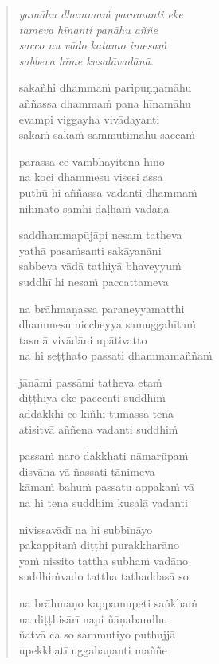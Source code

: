 \begin{verse}
\emph{yamāhu dhammaṁ paramanti eke\\
tameva hīnanti panāhu aññe}\\
\emph{sacco nu vādo katamo imesaṁ\\
sabbeva hīme kusalāvadānā.}

sakañhi dhammaṁ paripuṇṇamāhu\\
aññassa dhammaṁ pana hīnamāhu\\
evampi viggayha vivādayanti\\
sakaṁ sakaṁ sammutimāhu saccaṁ

parassa ce vambhayitena hīno\\
na koci dhammesu visesi assa\\
puthū hi aññassa vadanti dhammaṁ\\
nihīnato samhi daḷhaṁ vadānā

saddhammapūjāpi nesaṁ tatheva\\
yathā pasaṁsanti sakāyanāni\\
sabbeva vādā tathiyā bhaveyyuṁ\\
suddhī hi nesaṁ paccattameva

na brāhmaṇassa paraneyyamatthi\\
dhammesu niccheyya samuggahītaṁ\\
tasmā vivādāni upātivatto\\
na hi seṭṭhato passati dhammamaññaṁ

jānāmi passāmi tatheva etaṁ\\
diṭṭhiyā eke paccenti suddhiṁ\\
addakkhi ce kiñhi tumassa tena\\
atisitvā aññena vadanti suddhiṁ

passaṁ naro dakkhati nāmarūpaṁ\\
disvāna vā ñassati tānimeva\\
kāmaṁ bahuṁ passatu appakaṁ vā\\
na hi tena suddhiṁ kusalā vadanti

nivissavādī na hi subbināyo\\
pakappitaṁ diṭṭhi purakkharāno\\
yaṁ nissito tattha subhaṁ vadāno\\
suddhiṁvado tattha tathaddasā so

na brāhmaṇo kappamupeti saṅkhaṁ\\
na diṭṭhisārī napi ñāṇabandhu\\
ñatvā ca so sammutiyo puthujjā\\
upekkhatī uggahaṇanti maññe


\end{verse}
